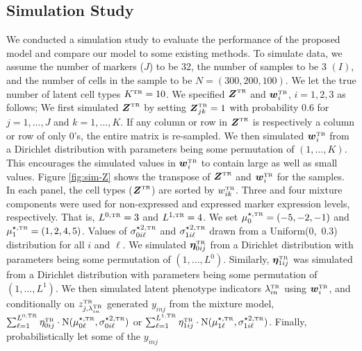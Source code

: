 \documentclass[12pt,]{article}
\newcommand{\N}{ \mathcal{N} }
\def\bet{\bm{\eta}}
\def\N{\text{N}}
\newcommand{\true}{{\mbox{\tiny TR}}}
\newcommand{\bZ}{\mbox{\boldmath $Z$}}
\newcommand{\bw}{\mbox{\boldmath $w$}}
\begin{document}
\subsection{Simulation Study}\label{sec:CB-sim} %
We conducted a simulation study to evaluate the performance of the proposed
model and compare our model to some existing methods.
To simulate data, we assume the number of markers ($J$) to be 32, 
the number of samples to be 3 $(I)$, and the number of cells in the sample to
be $N=(300, 200, 100)$.  We let the true number of latent cell types
$K^\true=10$.  We specified $\bZ^\true$ and $\bw^\true_i$, $i=1,2,3$ as
follows; We first simulated $\bZ^\true$ by setting $\bZ^\true_{jk}=1$ with
probability 0.6 for $j=1,...,J$ and $k=1,...,K$. If any column or row in
$\bZ^\true$ is respectively a column or row of only 0's, the entire matrix is
re-sampled.
We then simulated $\bw^\true_i$ from a Dirichlet distribution with parameters
being some permutation of $(1, \ldots,K)$. This encourages the simulated values
in $\bw^\true_i$ to contain large as well as small values.
%
Figure \ref{fig:sim-Z} shows the transpose of $\bZ^\true$ and $\bw^\true_i$ for
the samples. In each panel, the cell types ($\bZ^\true$) are sorted by
$w_{ik}^\true$.  Three and four mixture components were used for non-expressed
and expressed marker expression levels, respectively. That is, $L^{0, \true}=3$
and $L^{1, \true}=4$. We set  $\mu^{\star, \true}_{0} = (-5, -2, -1)$ and
$\mu^{\star, \true}_{1} = (1, 2, 4, 5)$. Values of $\sigma^{\star 2,
\true}_{0i\ell}$ and $\sigma^{\star 2,\true}_{1i\ell}$ drawn 
from a Uniform(0,~0.3) distribution for all $i$ and $\ell$.
%
We simulated $\bet_{0ij}^\true$ from a Dirichlet distribution with
parameters being some permutation of $(1,...,L^0)$. Similarly, 
$\bet_{1ij}^\true$ was simulated from a Dirichlet distribution with
parameters being some permutation of $(1,...,L^1)$.
%
We then simulated latent phenotype indicators $\lambda_{in}^\true$ using
$\bw_i^\true$, and conditionally on $z^\true_{j,\lambda_{in}^\true}$ generated
$y_{inj}$ from the mixture model, $\sum_{\ell=1}^{L^{0,\true}}
\eta^\true_{0ij}\cdot\N(\mu^{\star, \true}_{0\ell}, \sigma^{\star 2,
\true}_{0i\ell})$ or $\sum_{\ell=1}^{L^{1,\true}}
\eta^\true_{1ij}\cdot\N(\mu^{\star, \true}_{1\ell}, \sigma^{\star 2,
\true}_{1i\ell})$. Finally, probabilistically let some of the $y_{inj}$
\end{document}
